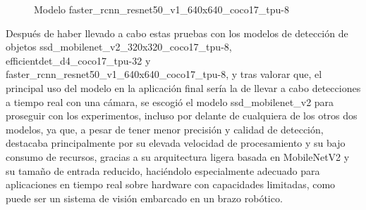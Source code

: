   	\begin{figure}[H]
    		\begin{center}
      		\subcapcentertrue
      		\hspace{2mm}
    	\end{center}
    	\caption{Modelo faster\_rcnn\_resnet50\_v1\_640x640\_coco17\_tpu-8 }
    	\label{fig:modelo_faster_rcnn_resnet50}
  	\end{figure}	
  	
\pagebreak
Después de haber llevado a cabo estas pruebas con los modelos de detección de objetos ssd\_mobilenet\_v2\_320x320\_coco17\_tpu-8, efficientdet\_d4\_coco17\_tpu-32 y faster\_rcnn\_resnet50\_v1\_640x640\_coco17\_tpu-8, y tras valorar que, el principal uso del modelo en la aplicación final sería la de llevar a cabo detecciones a tiempo real con una cámara, se escogió el modelo ssd\_mobilenet\_v2 para proseguir con los experimentos, incluso por delante de cualquiera de los otros dos modelos, ya que, a pesar de tener menor precisión y calidad de detección, destacaba principalmente por su elevada velocidad de procesamiento y su bajo consumo de recursos, gracias a su arquitectura ligera basada en MobileNetV2 y su tamaño de entrada reducido, haciéndolo especialmente adecuado para aplicaciones en tiempo real sobre hardware con capacidades limitadas, como puede ser un sistema de visión embarcado en un brazo robótico.\\


